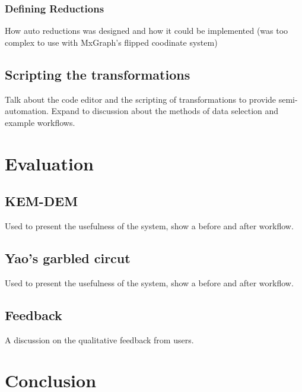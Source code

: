 \documentclass[bsc,frontabs,singlespacing,parskip,deptreport]{infthesis}
\begin{document}
\subsection{Defining Reductions}

How auto reductions was designed and how it could be implemented (was too complex to use with MxGraph's flipped coodinate system)

\section{Scripting the transformations}
Talk about the code editor and the scripting of transformations to provide semi-automation. Expand to discussion about the methods of data selection and example workflows. 

\chapter{Evaluation}

\section{KEM-DEM}
Used to present the usefulness of the system, show a before and after workflow. 

\section{Yao's garbled circut}
Used to present the usefulness of the system, show a before and after workflow. 

\section{Feedback}
A discussion on the qualitative feedback from users.

\chapter{Conclusion}





%
%
%
\end{document}
